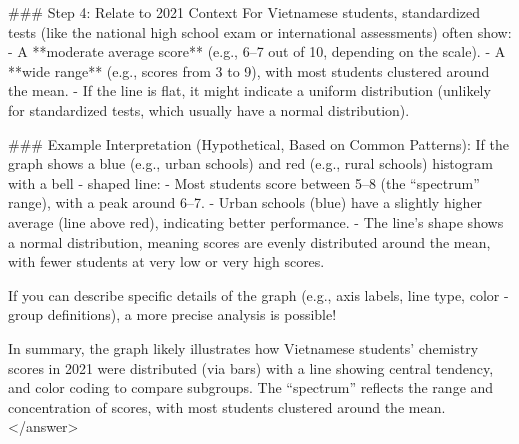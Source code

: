 ### Step 4: Relate to 2021 Context  
For Vietnamese students, standardized tests (like the national high school exam or international assessments) often show:  
- A **moderate average score** (e.g., 6–7 out of 10, depending on the scale).  
- A **wide range** (e.g., scores from 3 to 9), with most students clustered around the mean.  
- If the line is flat, it might indicate a uniform distribution (unlikely for standardized tests, which usually have a normal distribution).  


### Example Interpretation (Hypothetical, Based on Common Patterns):  
If the graph shows a blue (e.g., urban schools) and red (e.g., rural schools) histogram with a bell - shaped line:  
- Most students score between 5–8 (the “spectrum” range), with a peak around 6–7.  
- Urban schools (blue) have a slightly higher average (line above red), indicating better performance.  
- The line’s shape shows a normal distribution, meaning scores are evenly distributed around the mean, with fewer students at very low or very high scores.  


If you can describe specific details of the graph (e.g., axis labels, line type, color - group definitions), a more precise analysis is possible!  

In summary, the graph likely illustrates how Vietnamese students’ chemistry scores in 2021 were distributed (via bars) with a line showing central tendency, and color coding to compare subgroups. The “spectrum” reflects the range and concentration of scores, with most students clustered around the mean.</answer>